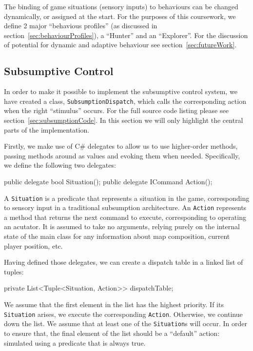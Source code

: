 \documentclass[11pt]{article}
\begin{document}
The binding of game situations (sensory inputs) to behaviours can be changed dynamically, or assigned at the start. For the purposes of this coursework, we define 2 major ``behavious profiles'' (as discussed in section~\ref{sec:behaviourProfiles}), a ``Hunter'' and an ``Explorer''. For the discussion of potential for dynamic and adaptive behaviour see section~\ref{sec:futureWork}.
\subsection{Subsumptive Control}

In order to make it possible to implement the subsumptive control system, we have created a class, \verb|SubsumptionDispatch|, which calls the corresponding action when the right ``stimulus'' occurs. For the full source code listing please see section~\ref{sec:subsumptionCode}. In this section we will only highlight the central parts of the implementation.

Firstly, we make use of C\# delegates to allow us to use higher-order methods, passing methods around as values and evoking them when needed. Specifically, we define the following two delegates:

\begin{code}
public delegate bool Situation();
public delegate ICommand Action();
\end{code}

A \verb|Situation| is a predicate that represents a situation in the game, corresponding to sensory input in a traditional subsumption architecture. An \verb|Action| represents a method that returns the next command to execute, corresponding to operating an acutator. It is assumed to take no arguments, relying purely on the internal state of the main class for any information about map composition, current player position, etc.

Having defined those delegates, we can create a dispatch table in a linked list of tuples:

\begin{code}
private List<Tuple<Situation, Action>> dispatchTable;
\end{code}

We assume that the first element in the list has the highest priority. If its \verb|Situation| arises, we execute the corresponding \verb|Action|. Otherwise, we continue down the list. We assume that at least one of the \verb|Situation|s will occur. In order to ensure that, the final element of the list should be a ``default'' action: simulated using a predicate that is always true.
\end{document}
